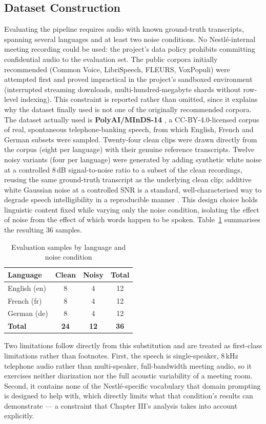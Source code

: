 \documentclass[12pt]{report}
\begin{document}
\subsection{Dataset Construction}
Evaluating the pipeline requires audio with known ground-truth transcripts, spanning several languages and at least two noise conditions. No Nestl\'e-internal meeting recording could be used: the project's data policy prohibits committing confidential audio to the evaluation set. The public corpora initially recommended (Common Voice, LibriSpeech, FLEURS, VoxPopuli) were attempted first and proved impractical in the project's sandboxed environment (interrupted streaming downloads, multi-hundred-megabyte shards without row-level indexing). This constraint is reported rather than omitted, since it explains why the dataset finally used is not one of the originally recommended corpora.
The dataset actually used is \textbf{PolyAI/MInDS-14} \cite{gerz2021multilingual}, a CC-BY-4.0-licensed corpus of real, spontaneous telephone-banking speech, from which English, French and German subsets were sampled. Twenty-four clean clips were drawn directly from the corpus (eight per language) with their genuine reference transcripts. Twelve noisy variants (four per language) were generated by adding synthetic white noise at a controlled 8\,dB signal-to-noise ratio to a subset of the clean recordings, reusing the same ground-truth transcript as the underlying clean clip; additive white Gaussian noise at a controlled SNR is a standard, well-characterised way to degrade speech intelligibility in a reproducible manner \cite{graetzer2021intelligibility}. This design choice holds linguistic content fixed while varying only the noise condition, isolating the effect of noise from the effect of which words happen to be spoken. Table~\ref{tab:dataset} summarises the resulting 36 samples.
\begin{table}[H]
\centering
\begin{tabular}{|l|c|c|c|}
\hline
\textbf{Language} & \textbf{Clean} & \textbf{Noisy} & \textbf{Total} \\ \hline
English (en) & 8 & 4 & 12 \\ \hline
French (fr) & 8 & 4 & 12 \\ \hline
German (de) & 8 & 4 & 12 \\ \hline
\textbf{Total} & \textbf{24} & \textbf{12} & \textbf{36} \\ \hline
\end{tabular}
\caption{Evaluation samples by language and noise condition}
\label{tab:dataset}
\end{table}
Two limitations follow directly from this substitution and are treated as first-class limitations rather than footnotes. First, the speech is single-speaker, 8\,kHz telephone audio rather than multi-speaker, full-bandwidth meeting audio, so it exercises neither diarization nor the full acoustic variability of a meeting room. Second, it contains none of the Nestl\'e-specific vocabulary that domain prompting is designed to help with, which directly limits what that condition's results can demonstrate --- a constraint that Chapter III's analysis takes into account explicitly.
\end{document}
